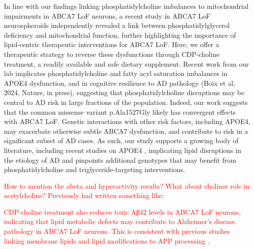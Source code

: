 In line with our findings linking phosphatidylcholine imbalances to mitochondrial impairments in ABCA7 LoF neurons, a recent study in ABCA7 LoF neurospheroids independently revealed a link between phosphatidylglycerol deficiency and mitochondrial function\cite{Kawatani2023-vf}, further highlighting the importance of lipid-centric therapeutic interventions for ABCA7 LoF. Here, we offer a therapeutic strategy to reverse these dysfunctions through CDP-choline treatment, a readily available and safe dietary supplement\cite{Gavrilova2018-oi,Zeisel2009-xv,Blusztajn2017-nv}.  Recent work from our lab implicates phosphatidylcholine and fatty acyl saturation imbalances in APOE4 dysfunction\cite{Sienski2021-zt}, and in cognitive resilience to AD pathology (Boix et al, 2024, Nature, in press), suggesting that phosphatidylcholine disruptions may be central to AD risk in large fractions of the population. Indeed, our work suggests that the common missense variant p.Ala1527Gly likely has convergent effects with ABCA7 LoF. Genetic interactions with other risk factors, including APOE4, may exacerbate otherwise subtle ABCA7 dysfunction, and contribute to risk in a significant subset of AD cases\cite{Wang2021-oa,Hemani2013-zr,Haig2011-vs,Zuk2012-uz}. As such, our study supports a growing body of literature, including recent studies on APOE4 \cite{Haney2024-fx,Victor2022-tl}, implicating lipid disruptions in the etiology of AD and pinpoints additional genotypes that may benefit from phosphatidylcholine and triglyceride-targeting interventions.


\textcolor{red}{How to mention the abeta and hyperactivity results? What about cholines role in acetylcholine? Previously had written something like:}

\textcolor{red}{CDP-choline treatment also reduces toxic Aβ42 levels in ABCA7 LoF neurons, indicating that lipid metabolic defects may contribute to Alzheimer’s disease pathology in ABCA7 LoF neurons. This is consistent with previous studies linking membrane lipids and lipid modifications to APP processing \cite{Bhattacharyya2016-rs,Walter2013-qu}.}